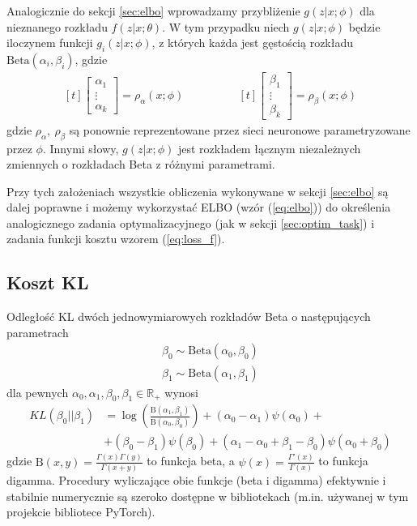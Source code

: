 \documentclass{iithesis}
\begin{document}
Analogicznie do sekcji \ref{sec:elbo} wprowadzamy przybliżenie $g(z|x;\phi)$
dla nieznanego rozkładu $f(z|x;\theta)$. W tym przypadku niech $g(z|x;\phi)$
będzie iloczynem funkcji $g_i(z|x;\phi)$, z których każda jest gęstością rozkładu
$\text{Beta}(\alpha_i, \beta_i)$, gdzie
\begin{equation*}
\begin{aligned}[t]
\begin{bmatrix}
\alpha_1 \\
\vdots \\
\alpha_k
\end{bmatrix}
= \rho_\alpha(x;\phi)
\end{aligned}
\qquad \qquad
\begin{aligned}[t]
\begin{bmatrix}
\beta_1 \\
\vdots \\
\beta_k
\end{bmatrix}
= \rho_\beta(x;\phi)
\end{aligned}
\end{equation*}
gdzie $\rho_\alpha,\ \rho_\beta$ są ponownie reprezentowane przez sieci neuronowe
parametryzowane przez $\phi$. Innymi słowy, $g(z|x;\phi)$ jest rozkładem łącznym
niezależnych zmiennych o rozkładach Beta z różnymi parametrami.

Przy tych założeniach wszystkie obliczenia wykonywane w sekcji \ref{sec:elbo}
są dalej poprawne i możemy wykorzystać ELBO (wzór (\ref{eq:elbo})) do
określenia analogicznego zadania optymalizacyjnego (jak w sekcji \ref{sec:optim_task})
i zadania funkcji kosztu wzorem (\ref{eq:loss_f}).

\subsection{Koszt KL}
Odległość KL dwóch jednowymiarowych rozkładów Beta o następujących parametrach
\begin{equation*}
\begin{split}
\beta_0 \sim \text{Beta}(\alpha_0, \beta_0) \\
\beta_1 \sim \text{Beta}(\alpha_1, \beta_1)
\end{split}
\end{equation*}
dla pewnych $\alpha_0,\alpha_1,\beta_0,\beta_1 \in \mathbb{R}_{+}$ wynosi
\begin{equation} \label{eq:univariate_beta_kl}
\begin{split}
KL(\beta_0 || \beta_1) &= \log \left( \frac{\text{B}(\alpha_1,\beta_1)}{\text{B}(\alpha_0,\beta_0)} \right)
+ (\alpha_0-\alpha_1)\psi(\alpha_0) +\\
&+ (\beta_0-\beta_1)\psi(\beta_0) + (\alpha_1-\alpha_0+\beta_1-\beta_0)\psi(\alpha_0+\beta_0)
\end{split}
\end{equation}
gdzie $\text{B}(x,y)=\frac{\Gamma(x)\Gamma(y)}{\Gamma(x+y)}$ to funkcja beta,
a $\psi(x)=\frac{\Gamma'(x)}{\Gamma(x)}$ to funkcja digamma.
Procedury wyliczające obie funkcje (beta i digamma) efektywnie i stabilnie numerycznie
są szeroko dostępne w bibliotekach (m.in. używanej w tym projekcie bibliotece PyTorch).
\end{document}
